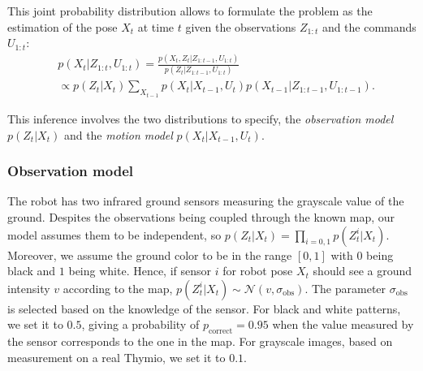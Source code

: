 \documentclass[letterpaper, 10pt, conference]{ieeeconf}
\begin{document}
This joint probability distribution allows to formulate the problem as the estimation of the pose $X_t$ at time $t$ given the observations $Z_{1:t}$ and the commands $U_{1:t}$:
\begin{equation*}
\begin{split}
& p(X_t|Z_{1:t},U_{1:t}) = \frac{p(X_t,Z_t | Z_{1:t-1}, U_{1:t})}{p(Z_t|Z_{1:t-1}, U_{1:t})} \\
 &\propto p(Z_t | X_t) \sum_{X_{t-1}} p(X_t|X_{t-1}, U_t) p(X_{t-1} | Z_{1:t-1}, U_{1:t-1}).
\end{split}
\end{equation*}

This inference involves the two distributions to specify, the \emph{observation model} $p(Z_t | X_t)$ and the \emph{motion model} $p(X_t|X_{t-1}, U_t)$.

\subsubsection{Observation model}

The robot has two infrared ground sensors measuring the grayscale value of the ground.
Despites the observations being coupled through the known map, our model assumes them to be independent, so $p(Z_t | X_t) = \prod_{i=0,1} p(Z_t^{i} | X_t)$.
Moreover, we assume the ground color to be in the range $[0,1]$ with $0$ being black and $1$ being white.
Hence, if sensor $i$ for robot pose $X_t$ should see a ground intensity $v$ according to the map, $p(Z_t^{i} | X_t) \sim \mathcal{N}(v,\sigma_\mathrm{obs})$.
The parameter $\sigma_\mathrm{obs}$ is selected based on the knowledge of the sensor.
For black and white patterns, we set it to $0.5$, giving a probability of $p_\mathrm{correct} = 0.95$ when the value measured by the sensor corresponds to the one in the map.
For grayscale images, based on measurement on a real Thymio, we set it to $0.1$.
\end{document}

